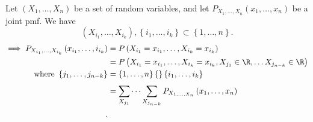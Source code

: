 

Let $\left( X_{1}, \ldots, X_{n} \right) $ be a set of random variables, and let $P_{X_{1}, \ldots, X_{n}} \left( x_1, \ldots, x_{n} \right) $ be a joint pmf. We have 
\[
	\left( X_{i_{1}}, \ldots, X_{i_{k}} \right) , \left\{ i_{1}, \ldots, i_{k} \right\} \subset \left\{ 1, \ldots, n \right\} 
.\] 
\begin{align*}
\implies	P_{X_{i_{1}}, \ldots , X _{i_{k}}} \left( x_{i_{1}}, \ldots , i _{i_{k}} \right) &= P\left( X_{i_{1}} = x_{i_{1}}, \ldots , X _{i_{k}} = x_{i_{k}}\right)  \\
											 &= P\left( X_{i_{1}} = x_{i_{1}}, \ldots, X _{i_{k}} = x _{i_{k}}, X _{j_{1}} \in \R, \ldots X _{j_{n-k}} \in \R \right)  \\
	\text{where  } \left\{ j _{1} , \ldots, j _{n-k}	\right\} &= \left\{ 1 , \ldots, n \right\} \{\}  \left\{ i_{1}, \ldots, i_{k} \right\} \\
									 &= \sum_{X_{j_{1}}}^{} \cdots \sum_{X_{j_{n-k}}}^{} P_{X_{1, \ldots, X_{n}}} \left( x_{1}, \ldots, x_{n} \right)  \\
.\end{align*}

